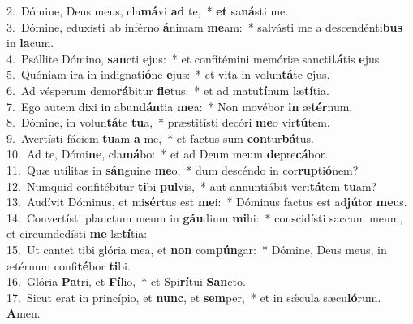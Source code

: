 {2.~}Dómine, Deus meus, cla\textbf{má}vi \textbf{ad} te,~* \textbf{et} sa\textbf{ná}sti me.\\
{3.~}Dómine, eduxísti ab inférno \textbf{á}nimam \textbf{me}am:~* salvásti me a descendénti\textbf{bus} in \textbf{la}cum.\\
{4.~}Psállite Dómino, \textbf{san}cti \textbf{e}jus:~* et confitémini memóriæ sancti\textbf{tá}tis \textbf{e}jus.\\
{5.~}Quóniam ira in indignati\textbf{ó}ne \textbf{e}jus:~* et vita in volun\textbf{tá}te \textbf{e}jus.\\
{6.~}Ad vésperum demo\textbf{rá}bitur \textbf{fle}tus:~* et ad matu\textbf{tí}num læ\textbf{tí}tia.\\
{7.~}Ego autem dixi in abun\textbf{dán}tia \textbf{me}a:~* Non movébor \textbf{in} æ\textbf{tér}num.\\
{8.~}Dómine, in volun\textbf{tá}te \textbf{tu}a,~* præstitísti decóri \textbf{me}o vir\textbf{tú}tem.\\
{9.~}Avertísti fáciem \textbf{tu}am \textbf{a} me,~* et factus sum \textbf{con}tur\textbf{bá}tus.\\
{10.~}Ad te, Dómi\textbf{ne}, cla\textbf{má}bo:~* et ad Deum meum \textbf{de}pre\textbf{cá}bor.\\
{11.~}Quæ utílitas in \textbf{sán}guine \textbf{me}o,~* dum descéndo in cor\textbf{rup}ti\textbf{ó}nem?\\
{12.~}Numquid confitébitur \textbf{ti}bi \textbf{pul}vis,~* aut annuntiábit veri\textbf{tá}tem \textbf{tu}am?\\
{13.~}Audívit Dóminus, et mi\textbf{sér}tus est \textbf{me}i:~* Dóminus factus est ad\textbf{jú}tor \textbf{me}us.\\
{14.~}Convertísti planctum meum in \textbf{gáu}dium \textbf{mi}hi:~* conscidísti saccum meum, et circumdedísti \textbf{me} læ\textbf{tí}tia:\\
{15.~}Ut cantet tibi glória mea, et \textbf{non} com\textbf{pún}gar:~* Dómine, Deus meus, in ætérnum confi\textbf{té}bor \textbf{ti}bi.\\
{16.~}Glória \textbf{Pa}tri, et \textbf{Fí}lio,~* et Spi\textbf{rí}tui \textbf{San}cto.\\
{17.~}Sicut erat in princípio, et \textbf{nunc}, et \textbf{sem}per,~* et in sǽcula sæcu\textbf{ló}rum. \textbf{A}men.\\
